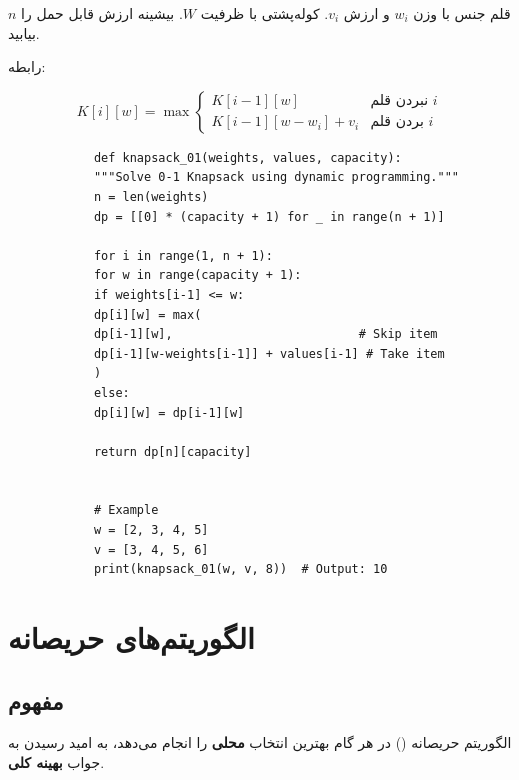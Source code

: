 \documentclass{matinbook}
\begin{document}
    \begin{definition}
        $n$ قلم جنس با وزن $w_{i}$ و ارزش $v_{i}$.
        کوله‌پشتی با ظرفیت $W$.
        بیشینه ارزش قابل حمل را بیابید.
        \label{def:knapsack}
    \end{definition}
    
    رابطه:
    
    \[
    K[i][w] = \max \begin{cases}
        K[i-1][w] & \text{نبردن قلم } i \\
        K[i-1][w-w_{i}] + v_{i} & \text{بردن قلم } i
    \end{cases}
    \]
    
    \begin{latin}
        \begin{verbatim}
            def knapsack_01(weights, values, capacity):
            """Solve 0-1 Knapsack using dynamic programming."""
            n = len(weights)
            dp = [[0] * (capacity + 1) for _ in range(n + 1)]
            
            for i in range(1, n + 1):
            for w in range(capacity + 1):
            if weights[i-1] <= w:
            dp[i][w] = max(
            dp[i-1][w],                          # Skip item
            dp[i-1][w-weights[i-1]] + values[i-1] # Take item
            )
            else:
            dp[i][w] = dp[i-1][w]
            
            return dp[n][capacity]
            
            
            # Example
            w = [2, 3, 4, 5]
            v = [3, 4, 5, 6]
            print(knapsack_01(w, v, 8))  # Output: 10
        \end{verbatim}
    \end{latin}
    \label{code:knapsack}
    
    \section{الگوریتم‌های حریصانه}
    
    \subsection{مفهوم}
    
    الگوریتم حریصانه
    () در هر گام
    بهترین انتخاب \textbf{محلی} را انجام می‌دهد،
    به امید رسیدن به جواب \textbf{بهینه کلی}.
    
\end{document}
